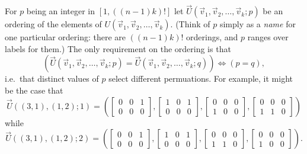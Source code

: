 \documentclass{article}
\begin{document}
\label{def:ordering}For $p$ being an integer in $[1,((n-1)k)!]$ let $\vec U(\vec v_1, \vec v_2, \ldots, \vec v_k; p)$ be an ordering of the elements of $U(\vec v_1, \vec v_2, \ldots, \vec v_k)$.  (Think of $p$ simply as a \emph{name} for one particular ordering: there are $((n-1)k)!$ orderings, and $p$ ranges over labels for them.)  The only requirement on the ordering is that $$\left( 
\vec U(\vec v_1, \vec v_2, \ldots, \vec v_k; p) = 
\vec U(\vec v_1, \vec v_2, \ldots, \vec v_k; q) \right)
\iff
\left( p=q \right),
$$
i.e.~that distinct values of $p$ select different permuations.
%
For example, it might be the case that 
$$\vec U((3,1), (1,2); 1) = \left(
\begin{bmatrix}
0 & 0 & 1 \\
0 & 0 & 0
\end{bmatrix},
\begin{bmatrix}
1 & 0 & 1 \\
0 & 0 & 0
\end{bmatrix},
\begin{bmatrix}
0 & 0 & 0 \\
1 & 0 & 0
\end{bmatrix},
\begin{bmatrix}
0 & 0 & 0 \\
1 & 1 & 0 
\end{bmatrix}
\right)$$
while
$$\vec U((3,1), (1,2); 2) = \left(
\begin{bmatrix}
0 & 0 & 1 \\
0 & 0 & 0
\end{bmatrix},
\begin{bmatrix}
1 & 0 & 1 \\
0 & 0 & 0
\end{bmatrix},
\begin{bmatrix}
0 & 0 & 0 \\
1 & 1 & 0 
\end{bmatrix},
\begin{bmatrix}
0 & 0 & 0 \\
1 & 0 & 0
\end{bmatrix}
\right).$$
\end{document}
